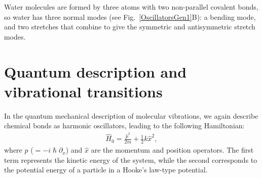 Water molecules are formed by three atoms with two non-parallel covalent bonds, so water has three normal modes (see Fig.\ \ref{OscillatorsGen1}B): a bending mode, and two  stretches that combine to give the symmetric and antisymmetric stretch modes.\!\cite{Wang2004,Bakker2010,Perakis2016}



\section{Quantum description and vibrational transitions}


In the quantum mechanical description of molecular vibrations, we again describe chemical bonds as harmonic oscillators, leading to the following Hamiltonian:
\begin{eqnarray}
\hat{H}_0 = \frac{\hat{p}^2}{2m} + \frac{1}{2} k \hat{x}^2,
\label{SchodringerStatic}
\end{eqnarray} 
where $\hat{p}$ ($= -i \hslash \partial_x$) and $\hat{x}$ are the momentum and position operators. The first term represents the kinetic energy of the system, while the second corresponds to the potential energy of a particle in a Hooke's law-type potential. 

